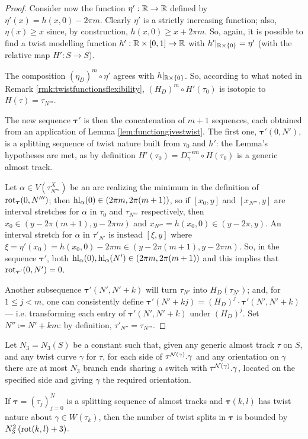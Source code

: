 \begin{proof}
Consider now the function $\eta':\mathbb R\rightarrow\mathbb R$ defined by $\eta'(x)=h(x,0)-2\pi m$. Clearly $\eta'$ is a strictly increasing function; also, $\eta(x)\geq x$ since, by construction, $h(x,0)\geq x+2\pi m$. So, again, it is possible to find a twist modelling function $h':\mathbb R\times[0,1]\rightarrow \mathbb R$ with $h'|_{\mathbb R\times\{0\}}=\eta'$ (with the relative map $H':S\rightarrow S$).

The composition $(\eta_D)^{m}\circ \eta'$ agrees with $h|_{\mathbb R\times\{0\}}$. So, according to what noted in Remark \ref{rmk:twistfunctionsflexibility}, $(H_D)^{m}\circ H'(\tau_0)$ is isotopic to $H(\tau)=\tau_{N'''}$.

The new sequence $\bm\tau'$ is then the concatenation of $m+1$ sequences, each obtained from an application of Lemma \ref{lem:functiongivestwist}. The first one, $\bm\tau'(0,N')$, is a splitting sequence of twist nature built from $\tau_0$ and $h'$: the Lemma's hypotheses are met, as by definition $H'(\tau_0)=D_\gamma^{-\epsilon m}\circ H(\tau_0)$ is a generic almost track.

Let $\alpha\in V(\tau_{N'''}^X)$ be an arc realizing the minimum in the definition of $\mathrm{rot}_{\bm\tau}(0,N''')$; then $\mathrm{hl}_\alpha(0)\in (2\pi m,2\pi(m+1))$, so if $[x_0,y]$ and $[x_{N'''},y]$ are interval stretches for $\alpha$ in $\tau_0$ and $\tau_{N'''}$ respectively, then $x_0\in (y-2\pi(m+1),y-2\pi m)$ and $x_{N'''}=h(x_0,0) \in (y-2\pi,y)$. An interval stretch for $\alpha$ in $\tau'_{N'}$ is instead $[\xi,y]$ where $\xi=\eta'(x_0)= h(x_0,0)-2\pi m \in (y-2\pi(m+1),y-2\pi m)$. So, in the sequence $\bm\tau'$, both $\mathrm{hl}_\alpha(0), \mathrm{hl}_\alpha(N')\in (2\pi m,2\pi (m+1))$ and this implies that $\mathrm{rot}_{\bm\tau'}(0,N')=0$.

Another subsequence $\bm\tau'(N',N'+k)$ will turn $\tau_{N'}$ into $H_D(\tau_{N'})$; and, for $1\leq j<m$, one can consistently define $\bm\tau'(N'+kj)= (H_D)^j\cdot\bm\tau'(N',N'+k)$ --- i.e. transforming each entry of $\bm\tau'(N',N'+k)$ under $(H_D)^j$. Set $N''\coloneqq N'+km$: by definition, $\tau'_{N''}=\tau_{N'''}$.
\end{proof}

\begin{lemma}\label{lem:twistsplitnumber}
Let $N_3=N_3(S)$ be a constant such that, given any generic almost track $\tau$ on $S$, and any twist curve $\gamma$ for $\tau$, for each side of $\tau^{{\mathcal N}(\gamma)}.\gamma$ and any orientation on $\gamma$ there are at most $N_3$ branch ends sharing a switch with $\tau^{{\mathcal N}(\gamma)}.\gamma$, located on the specified side and giving $\gamma$ the required orientation.

If $\bm\tau=(\tau_j)_{j=0}^N$ is a splitting sequence of almost tracks and $\bm\tau(k,l)$ has twist nature about $\gamma\in W(\tau_k)$, then the number of twist splits in $\bm\tau$ is bounded by $N_3^2\left(\mathrm{rot}(k,l)+3\right)$.
\end{lemma}

